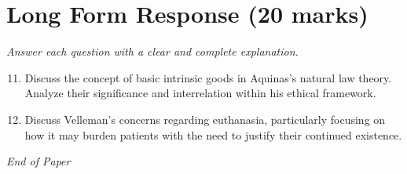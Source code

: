 \documentclass[12pt]{article}
\begin{document}
\section*{Long Form Response (20 marks)}
\textit{Answer each question with a clear and complete explanation.}
\begin{enumerate}[label=\arabic*.]
\setcounter{enumi}{10}
\item Discuss the concept of basic intrinsic goods in Aquinas's natural law theory. Analyze their significance and interrelation within his ethical framework.
\item Discuss Velleman's concerns regarding euthanasia, particularly focusing on how it may burden patients with the need to justify their continued existence.
\end{enumerate}

\vfill
\noindent\textit{End of Paper}
\end{document}
